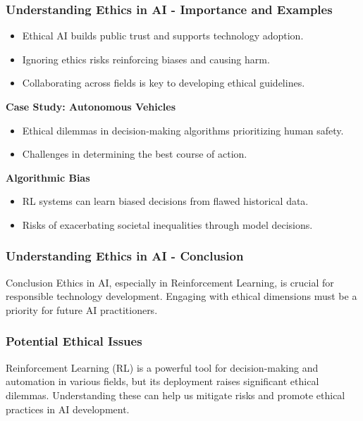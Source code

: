 \documentclass{beamer}
\begin{document}
\begin{frame}[fragile]
    \frametitle{Understanding Ethics in AI - Importance and Examples}
    \begin{itemize}
        \item Ethical AI builds public trust and supports technology adoption.
        \item Ignoring ethics risks reinforcing biases and causing harm.
        \item Collaborating across fields is key to developing ethical guidelines.
    \end{itemize}
    
    \textbf{Case Study: Autonomous Vehicles}
    \begin{itemize}
        \item Ethical dilemmas in decision-making algorithms prioritizing human safety.
        \item Challenges in determining the best course of action.
    \end{itemize}
    
    \textbf{Algorithmic Bias}
    \begin{itemize}
        \item RL systems can learn biased decisions from flawed historical data.
        \item Risks of exacerbating societal inequalities through model decisions.
    \end{itemize}
\end{frame}

\begin{frame}[fragile]
    \frametitle{Understanding Ethics in AI - Conclusion}
    \begin{block}{Conclusion}
        Ethics in AI, especially in Reinforcement Learning, is crucial for responsible technology development. Engaging with ethical dimensions must be a priority for future AI practitioners.
    \end{block}
\end{frame}

\begin{frame}[fragile]
    \frametitle{Potential Ethical Issues}
    Reinforcement Learning (RL) is a powerful tool for decision-making and automation in various fields, but its deployment raises significant ethical dilemmas. 
    Understanding these can help us mitigate risks and promote ethical practices in AI development.
\end{frame}
\end{document}
